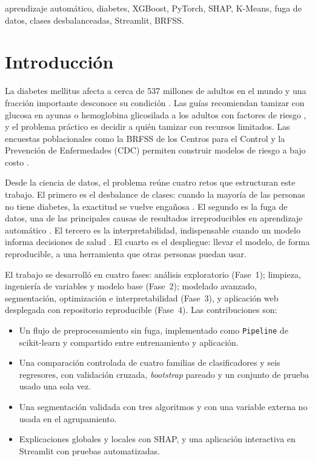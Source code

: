 \documentclass[conference,a4paper]{IEEEtran}
\begin{document}
\begin{IEEEkeywords}
aprendizaje automático, diabetes, XGBoost, PyTorch, SHAP, K-Means, fuga de datos, clases desbalanceadas, Streamlit, BRFSS.
\end{IEEEkeywords}

\section{Introducción}
La diabetes mellitus afecta a cerca de 537 millones de adultos en el mundo y una fracción importante desconoce su condición \citep{idf2021}. Las guías recomiendan tamizar con glucosa en ayunas o hemoglobina glicosilada a los adultos con factores de riesgo \citep{ada2024}, y el problema práctico es decidir a quién tamizar con recursos limitados. Las encuestas poblacionales como la BRFSS de los Centros para el Control y la Prevención de Enfermedades (CDC) \citep{cdc2023} permiten construir modelos de riesgo a bajo costo \citep{xie2019}.

Desde la ciencia de datos, el problema reúne cuatro retos que estructuran este trabajo. El primero es el desbalance de clases: cuando la mayoría de las personas no tiene diabetes, la exactitud se vuelve engañosa \citep{he2009}. El segundo es la fuga de datos, una de las principales causas de resultados irreproducibles en aprendizaje automático \citep{kapoor2023,kaufman2012}. El tercero es la interpretabilidad, indispensable cuando un modelo informa decisiones de salud \citep{lundberg2020}. El cuarto es el despliegue: llevar el modelo, de forma reproducible, a una herramienta que otras personas puedan usar.

El trabajo se desarrolló en cuatro fases: análisis exploratorio (Fase~1); limpieza, ingeniería de variables y modelo base (Fase~2); modelado avanzado, segmentación, optimización e interpretabilidad (Fase~3), y aplicación web desplegada con repositorio reproducible (Fase~4). Las contribuciones son:
\begin{itemize}
\item Un flujo de preprocesamiento sin fuga, implementado como \texttt{Pipeline} de scikit-learn y compartido entre entrenamiento y aplicación.
\item Una comparación controlada de cuatro familias de clasificadores y seis regresores, con validación cruzada, \textit{bootstrap} pareado y un conjunto de prueba usado una sola vez.
\item Una segmentación validada con tres algoritmos y con una variable externa no usada en el agrupamiento.
\item Explicaciones globales y locales con SHAP, y una aplicación interactiva en Streamlit con pruebas automatizadas.
\end{itemize}
\end{document}
